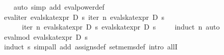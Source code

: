 \begin{isabellebody}
%
\isadelimproof
\ \ %
\endisadelimproof
%
\isatagproof
{}\isamarkupfalse%
\ {}auto\ simp\ add{}\ eval{}power{}def{}%
\endisatagproof
{\isafoldproof}%
%
\isadelimproof
\isanewline
%
\endisadelimproof
\isanewline
{}\isamarkupfalse%
\ eval{}iter{}{}\ {}eval{}skat{}expr\ D\ s\ {}iter\ n\ {}eval{}skat{}expr\ D\ s{}\ {}{}\isanewline
\ \ \ \ \ {}\ iter\ n\ {}eval{}skat{}expr\ D\ s{}\ {}eval{}skat{}expr\ D\ s\ {}{}{}\isanewline
%
\isadelimproof
\ \ %
\endisadelimproof
%
\isatagproof
{}\isamarkupfalse%
\ {}induct\ n{}\ auto{}%
\endisatagproof
{\isafoldproof}%
%
\isadelimproof
\isanewline
%
\endisadelimproof
\isanewline
{}\isamarkupfalse%
\ eval{}mod{}{}\ {}eval{}skat{}expr\ D\ s\ {}{}\ {}\ {}{}{}\isanewline
%
\isadelimproof
%
\endisadelimproof
%
\isatagproof
{}\isamarkupfalse%
\ {}induct\ s{}\ simp{}all\ add{}\ assigns{}def\ set{}mems{}def{}\ intro\ allI{}\isanewline

\end{isabellebody}
